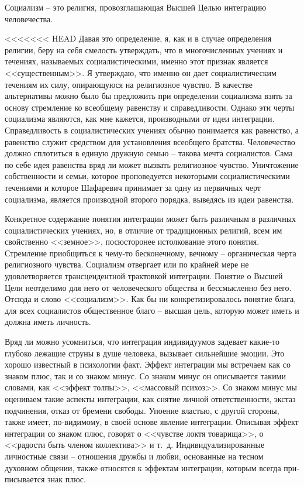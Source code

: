 \documentclass{book}
\begin{document}
Социализм -- это религия, провозглашающая Высшей Целью интеграцию человечества.

<<<<<<< HEAD
Давая это определение, я, как и в случае определения религии, беру на себя смелость утверждать, что в многочисленных учениях и течениях, называемых социалистическими, именно этот признак является <<существенным>>. Я утверждаю, что именно он дает социалистическим течениям их силу, опираю­щуюся на религиозное чувство. В качестве альтернативы можно было бы предложить при определении социализма взять за основу стремление ко всеобщему равенству и справедли­вости. Однако эти черты социализма являются, как мне кажется, производными от идеи интеграции. Справедливость в социалистических учениях обычно понимается как равенство, а равенство служит средством для установления всеобщего братства. Человечество должно сплотиться в единую дружную семью -- такова мечта социалистов. Сама по себе идея равенст­ва вряд ли может вызвать религиозное чувство. Уничтожение собственности и семьи, которое проповедуется некоторыми социалистическими течениями и которое Шафаревич прини­мает за одну из первичных черт социализма, является произ­водной второго порядка, выведясь из идеи равенства.

Конкретное содержание понятия интеграции может быть различным в различных социалистических учениях, но, в отли­чие от традиционных религий, всем им свойственно <<земное>>, посюсторонее истолкование этого понятия. Стремление приоб­щиться к чему‑то бесконечному, вечному -- органическая чер­та религиозного чувства. Социализм отвергает или по край­ней мере не удовлетворяется трансцендентной трактовкой ин­теграции. Понятие о Высшей Цели неотделимо для него от че­ловеческого общества и бессмысленно без него. Отсюда и слово <<социализм>>. Как бы ни конкретизировалось понятие блага, для всех социалистов общественное благо -- высшая цель, ко­торую может иметь и должна иметь личность.

Вряд ли можно усомниться, что интеграция индивидуумов задевает какие‑то глубоко лежащие струны в душе человека, вызывает сильнейшие эмоции. Это хорошо известный в психо­логии факт. Эффект интеграции мы встречаем как со знаком плюс, так и со знаком минус. Со знаком минус он описывает­ся такими словами, как <<эффект толпы>>, <<массовый психоз>>. Со знаком минус мы оцениваем такие аспекты интеграции, как снятие личной ответственности, экстаз подчинения, отказ от бремени свободы. Упоение властью, с другой стороны, также имеет, по‑видимому, в своей основе явление интеграции. Опи­сывая эффект интеграции со знаком плюс, говорят о <<чувст­ве локтя товарища>>, о <<радости быть членом коллектива>> и т.~д. Индивидуализированные личностные связи -- отношения дружбы и любви, основанные на тесном духовном общении, также относятся к эффектам интеграции, которым всегда при­писывается знак плюс.
\end{document}
